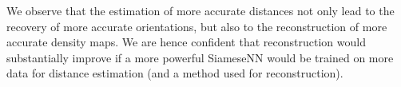 We observe that the estimation of more accurate distances not only lead to the recovery of more accurate orientations, but also to the reconstruction of more accurate density maps.
We are hence confident that reconstruction would substantially improve if a more powerful SiameseNN would be trained on more data for distance estimation (and a   method used for reconstruction).
